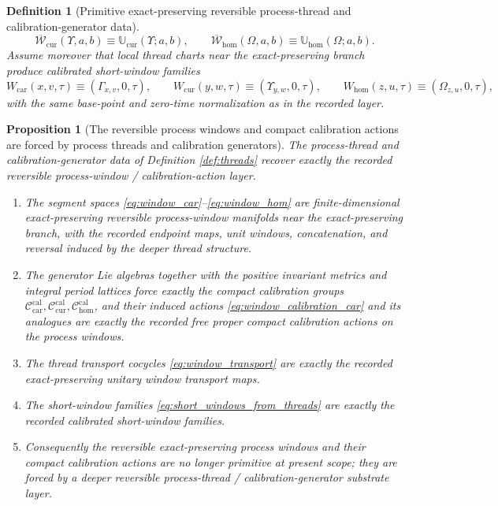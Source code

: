 \documentclass[11pt]{article}
\newcommand{\TensorCalGroup}{\mathcal C_{\mathrm{car}}^{\mathrm{cal}}}
\newcommand{\CurCalGroup}{\mathcal C_{\mathrm{cur}}^{\mathrm{cal}}}
\newcommand{\HomCalGroup}{\mathcal C_{\mathrm{hom}}^{\mathrm{cal}}}
\newcommand{\CurWindowRep}{\overline{\mathscr W}_{\mathrm{cur}}}
\newcommand{\HomWindowRep}{\overline{\mathscr W}_{\mathrm{hom}}}
\newcommand{\CurThreadRep}{\mathbb U_{\mathrm{cur}}}
\newcommand{\HomThreadRep}{\mathbb U_{\mathrm{hom}}}
\newtheorem{definition}{Definition}
\newtheorem{proposition}{Proposition}
\begin{document}
\begin{definition}[Primitive exact-preserving reversible process-thread and calibration-generator data]
\begin{equation}
\CurWindowRep(\Upsilon,a,b)\equiv\CurThreadRep(\Upsilon;a,b),\qquad
\HomWindowRep(\Omega,a,b)\equiv\HomThreadRep(\Omega;a,b).
\label{eq:window_transport}
\end{equation}
Assume moreover that local thread charts near the exact-preserving branch produce calibrated short-window families
\begin{equation}
W_{\mathrm{car}}(x,v,\tau)\equiv(\Gamma_{x,v},0,\tau),\qquad
W_{\mathrm{cur}}(y,w,\tau)\equiv(\Upsilon_{y,w},0,\tau),\qquad
W_{\mathrm{hom}}(z,u,\tau)\equiv(\Omega_{z,u},0,\tau),
\label{eq:short_windows_from_threads}
\end{equation}
with the same base-point and zero-time normalization as in the recorded layer.
\end{definition}

\begin{proposition}[The reversible process windows and compact calibration actions are forced by process threads and calibration generators]
\label{prop:windows_forced}
The process-thread and calibration-generator data of Definition \ref{def:threads} recover exactly the recorded reversible process-window / calibration-action layer.
\begin{enumerate}
    \item The segment spaces \eqref{eq:window_car}--\eqref{eq:window_hom} are finite-dimensional exact-preserving reversible process-window manifolds near the exact-preserving branch, with the recorded endpoint maps, unit windows, concatenation, and reversal induced by the deeper thread structure.
    \item The generator Lie algebras together with the positive invariant metrics and integral period lattices force exactly the compact calibration groups \(\TensorCalGroup,\CurCalGroup,\HomCalGroup\), and their induced actions \eqref{eq:window_calibration_car} and its analogues are exactly the recorded free proper compact calibration actions on the process windows.
    \item The thread transport cocycles \eqref{eq:window_transport} are exactly the recorded exact-preserving unitary window transport maps.
    \item The short-window families \eqref{eq:short_windows_from_threads} are exactly the recorded calibrated short-window families.
    \item Consequently the reversible exact-preserving process windows and their compact calibration actions are no longer primitive at present scope; they are forced by a deeper reversible process-thread / calibration-generator substrate layer.
\end{enumerate}
\end{proposition}
\end{document}
